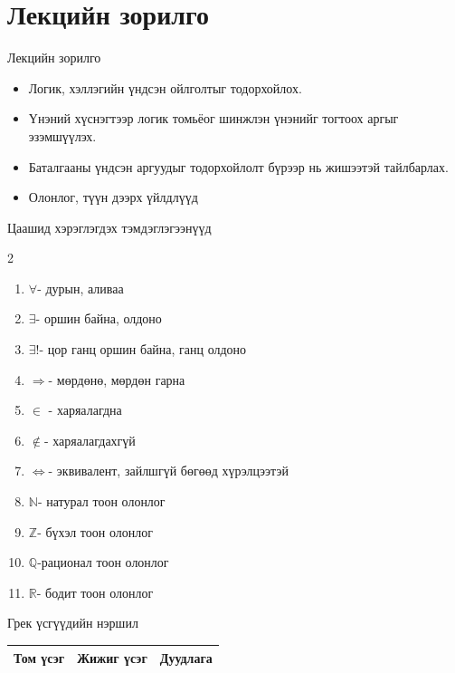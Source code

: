 

\section*{Лекцийн зорилго}
\begin{frame}[allowframebreaks]{Лекцийн зорилго}
\begin{itemize}
  \item Логик, хэллэгийн үндсэн ойлголтыг тодорхойлох.
  \item Үнэний хүснэгтээр логик томьёог шинжлэн үнэнийг тогтоох аргыг эзэмшүүлэх.
  \item Баталгааны үндсэн аргуудыг тодорхойлолт бүрээр нь жишээтэй тайлбарлах.
  \item Олонлог, түүн дээрх үйлдлүүд
\end{itemize}
Цаашид хэрэглэгдэх тэмдэглэгээнүүд\\
\begin{multicols}{2}
\begin{enumerate}
\item $\forall$- дурын, аливаа
\item $\exists$- оршин байна, олдоно
\item $\exists!$- цор ганц оршин байна, ганц олдоно 
\item $\Rightarrow$- мөрдөнө, мөрдөн гарна
\item $\in$ - харяалагдна
\item $\notin$- харяалагдахгүй
\item $\Leftrightarrow$- эквивалент, зайлшгүй бөгөөд хүрэлцээтэй
\item $\mathbb{N}$- натурал тоон олонлог
\item $\mathbb{Z}$- бүхэл тоон олонлог
\item $\mathbb{Q}$-рационал тоон олонлог
\item $\mathbb{R}$- бодит тоон олонлог
\end{enumerate}
 Грек үсгүүдийн нэршил\\
\begin{fitbox}\begin{tabular}{c|c|l}
\hline
Том үсэг & Жижиг үсэг & Дуудлага \\ \hline

\end{tabular}
\end{fitbox}
\end{multicols}
\end{frame}
